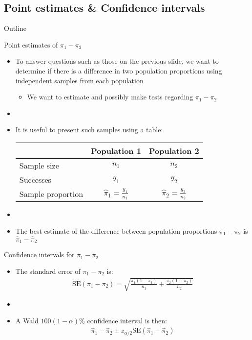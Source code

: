 \documentclass[xcolor=dvipsnames]{beamer}
\begin{document}
\subsection{Point estimates \& Confidence intervals}
\begin{frame}{Outline}
	\tableofcontents[currentsection,subsectionstyle=show/shaded/hide]
\end{frame}

\begin{frame}{Point estimates of $\pi_1 - \pi_2$}
	\begin{itemize}
		\item To answer questions such as those on the previous slide, we want to determine if there is a difference in two population proportions using independent samples from each population  \pause
		\begin{itemize}
			\item We want to estimate and possibly make tests regarding $\pi_1 - \pi_2$
		\end{itemize}  \pause
		\item[]
		\item It is useful to present such samples using a table:  \pause
		\begin{center}
			\begin{tabular}{lcc}
				\hline
				& Population 1 & Population 2 \\ \hline
				Sample size & $n_1$ & $n_2$ \\
				Successes & $y_1$ & $y_2$ \\
				Sample proportion & $\hat{\pi}_1 = \frac{y_1}{n_1}$ & $\hat{\pi}_2 = \frac{y_2}{n_2}$ \\ \hline
			\end{tabular}
		\end{center}  \pause
	\item[]
	\item The best estimate of the difference between population proportions $\pi_1 - \pi_2$ is $\hat{\pi}_1 - \hat{\pi}_2$
	\end{itemize}
\end{frame}

\begin{frame}{Confidence intervals for $\pi_1 - \pi_2$}
	\begin{itemize}
		\item The standard error of $\pi_1 - \pi_2$ is:  \pause
		\begin{gather*}
		\text{SE}(\pi_1 - \pi_2) = \sqrt{\frac{\pi_1 (1-\pi_1)}{n_1}+\frac{\pi_2 (1-\pi_2)}{n_2}}
		\end{gather*}  \pause
		\item[]
		\item A Wald $100(1-\alpha)\%$ confidence interval is then:  \pause
		\begin{gather*}
		\hat{\pi}_1 - \hat{\pi}_2 \pm z_{\alpha/2}\text{SE}(\hat{\pi}_1-\hat{\pi}_2)
		\end{gather*}
	\end{itemize}
\end{frame}
\end{document}
